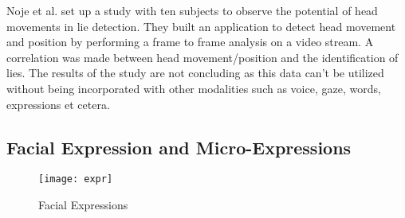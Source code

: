 Noje et al. \cite{7367432} set up a study with ten subjects to observe the potential of head movements in lie detection. They built an application to detect head movement and position by performing a frame to frame analysis on a video stream. A correlation was made between head movement/position and the identification of lies. The results of the study are not concluding as this data can't be utilized without being incorporated with other modalities such as voice, gaze, words, expressions et cetera.

\subsection*{Facial Expression and Micro-Expressions}

\begin{figure}[H]
	\centering
	\texttt{[image: expr]}
	\caption{Facial Expressions}
\end{figure}

